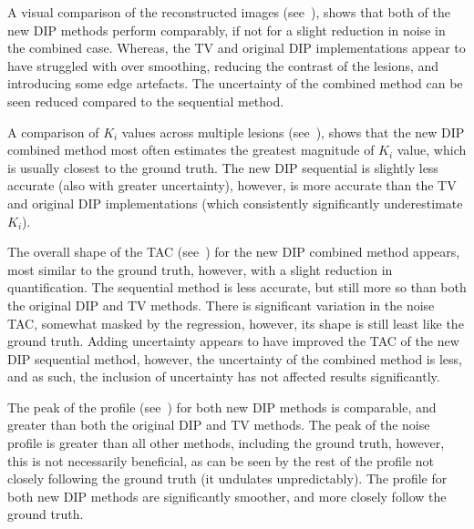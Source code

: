             A visual comparison of the reconstructed images (see~), shows that both of the new \gls{DIP} methods perform comparably, if not for a slight reduction in noise in the combined case. Whereas, the \gls{TV} and original \gls{DIP} implementations appear to have struggled with over smoothing, reducing the contrast of the lesions, and introducing some edge artefacts. The uncertainty of the combined method can be seen reduced compared to the sequential method.
            
            A comparison of $K_i$ values across multiple lesions (see~), shows that the new \gls{DIP} combined method most often estimates the greatest magnitude of $K_i$ value, which is usually closest to the ground truth. The new \gls{DIP} sequential is slightly less accurate (also with greater uncertainty), however, is more accurate than the \gls{TV} and original \gls{DIP} implementations (which consistently significantly underestimate $K_i$).
            
            The overall shape of the \gls{TAC} (see~) for the new \gls{DIP} combined method appears, most similar to the ground truth, however, with a slight reduction in quantification. The sequential method is less accurate, but still more so than both the original \gls{DIP} and \gls{TV} methods. There is significant variation in the noise \gls{TAC}, somewhat masked by the regression, however, its shape is still least like the ground truth. Adding uncertainty appears to have improved the \gls{TAC} of the new \gls{DIP} sequential method, however, the uncertainty of the combined method is less, and as such, the inclusion of uncertainty has not affected results significantly.
            
            The peak of the profile (see~) for both new \gls{DIP} methods is comparable, and greater than both the original \gls{DIP} and \gls{TV} methods. The peak of the noise profile is greater than all other methods, including the ground truth, however, this is not necessarily beneficial, as can be seen by the rest of the profile not closely following the ground truth (it undulates unpredictably). The profile for both new \gls{DIP} methods are significantly smoother, and more closely follow the ground truth.
             
